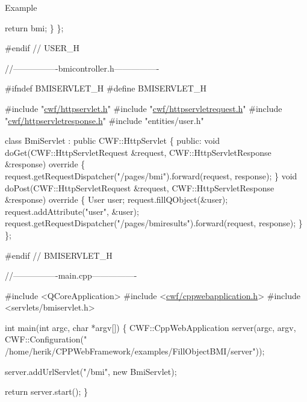 \begin{DoxyParagraph}{Example}
\begin{DoxyCode}
        \textcolor{keywordflow}{return} bmi;
    \}
\};

\textcolor{preprocessor}{#endif // USER\_H}

\textcolor{comment}{//----------------bmicontroller.h----------------}

\textcolor{preprocessor}{#ifndef BMISERVLET\_H}
\textcolor{preprocessor}{#define BMISERVLET\_H}

\textcolor{preprocessor}{#include "\hyperlink{httpservlet_8h}{cwf/httpservlet.h}"}
\textcolor{preprocessor}{#include "\hyperlink{httpservletrequest_8h}{cwf/httpservletrequest.h}"}
\textcolor{preprocessor}{#include "\hyperlink{httpservletresponse_8h}{cwf/httpservletresponse.h}"}
\textcolor{preprocessor}{#include "entities/user.h"}

\textcolor{keyword}{class }BmiServlet : \textcolor{keyword}{public} CWF::HttpServlet
\{
\textcolor{keyword}{public}:
    \textcolor{keywordtype}{void} doGet(CWF::HttpServletRequest &request, CWF::HttpServletResponse &response)\textcolor{keyword}{ override}
\textcolor{keyword}{    }\{
        request.getRequestDispatcher(\textcolor{stringliteral}{"/pages/bmi"}).forward(request, response);
    \}
    \textcolor{keywordtype}{void} doPost(CWF::HttpServletRequest &request, CWF::HttpServletResponse &response)\textcolor{keyword}{ override}
\textcolor{keyword}{    }\{
        User user;
        request.fillQObject(&user);
        request.addAttribute(\textcolor{stringliteral}{"user"}, &user);
        request.getRequestDispatcher(\textcolor{stringliteral}{"/pages/bmiresults"}).forward(request, response);
    \}
\};

\textcolor{preprocessor}{#endif // BMISERVLET\_H}

\textcolor{comment}{//----------------main.cpp----------------}

\textcolor{preprocessor}{#include <QCoreApplication>}
\textcolor{preprocessor}{#include <\hyperlink{cppwebapplication_8h}{cwf/cppwebapplication.h}>}
\textcolor{preprocessor}{#include <servlets/bmiservlet.h>}

\textcolor{keywordtype}{int} main(\textcolor{keywordtype}{int} argc, \textcolor{keywordtype}{char} *argv[])
\{
    CWF::CppWebApplication server(argc,
                                  argv,
                                  CWF::Configuration(\textcolor{stringliteral}{"
      /home/herik/CPPWebFramework/examples/FillObjectBMI/server"}));

    server.addUrlServlet(\textcolor{stringliteral}{"/bmi"}, \textcolor{keyword}{new} BmiServlet);

    \textcolor{keywordflow}{return} server.start();
\}
\end{DoxyCode}
 
\end{DoxyParagraph}
\mbox{\label{class_http_servlet_request_a6325279882fc5a910951b6ccec6ebb25}} 
